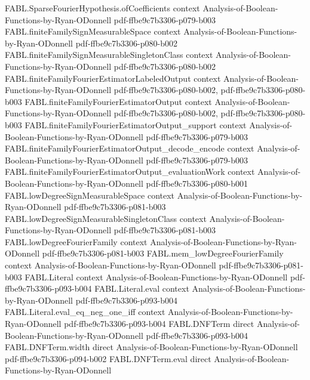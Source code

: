 \begin{theorem}
  {FABL.SparseFourierHypothesis.ofCoefficients}
  {context}
  {Analysis-of-Boolean-Functions-by-Ryan-ODonnell}
  {pdf-ffbe9c7b3306-p079-b003}
\proofstep
  {FABL.finiteFamilySignMeasurableSpace}
  {context}
  {Analysis-of-Boolean-Functions-by-Ryan-ODonnell}
  {pdf-ffbe9c7b3306-p080-b002}
\proofstep
  {FABL.finiteFamilySignMeasurableSingletonClass}
  {context}
  {Analysis-of-Boolean-Functions-by-Ryan-ODonnell}
  {pdf-ffbe9c7b3306-p080-b002}
\proofstep
  {FABL.finiteFamilyFourierEstimatorLabeledOutput}
  {context}
  {Analysis-of-Boolean-Functions-by-Ryan-ODonnell}
  {pdf-ffbe9c7b3306-p080-b002,
    pdf-ffbe9c7b3306-p080-b003}
\proofstep
  {FABL.finiteFamilyFourierEstimatorOutput}
  {context}
  {Analysis-of-Boolean-Functions-by-Ryan-ODonnell}
  {pdf-ffbe9c7b3306-p080-b002,
    pdf-ffbe9c7b3306-p080-b003}
\proofstep
  {FABL.finiteFamilyFourierEstimatorOutput_support}
  {context}
  {Analysis-of-Boolean-Functions-by-Ryan-ODonnell}
  {pdf-ffbe9c7b3306-p079-b003}
\proofstep
  {FABL.finiteFamilyFourierEstimatorOutput_decode_encode}
  {context}
  {Analysis-of-Boolean-Functions-by-Ryan-ODonnell}
  {pdf-ffbe9c7b3306-p079-b003}
\proofstep
  {FABL.finiteFamilyFourierEstimatorOutput_evaluationWork}
  {context}
  {Analysis-of-Boolean-Functions-by-Ryan-ODonnell}
  {pdf-ffbe9c7b3306-p080-b001}
\proofstep
  {FABL.lowDegreeSignMeasurableSpace}
  {context}
  {Analysis-of-Boolean-Functions-by-Ryan-ODonnell}
  {pdf-ffbe9c7b3306-p081-b003}
\proofstep
  {FABL.lowDegreeSignMeasurableSingletonClass}
  {context}
  {Analysis-of-Boolean-Functions-by-Ryan-ODonnell}
  {pdf-ffbe9c7b3306-p081-b003}
\proofstep
  {FABL.lowDegreeFourierFamily}
  {context}
  {Analysis-of-Boolean-Functions-by-Ryan-ODonnell}
  {pdf-ffbe9c7b3306-p081-b003}
\proofstep
  {FABL.mem_lowDegreeFourierFamily}
  {context}
  {Analysis-of-Boolean-Functions-by-Ryan-ODonnell}
  {pdf-ffbe9c7b3306-p081-b003}
\proofstep
  {FABL.Literal}
  {context}
  {Analysis-of-Boolean-Functions-by-Ryan-ODonnell}
  {pdf-ffbe9c7b3306-p093-b004}
\proofstep
  {FABL.Literal.eval}
  {context}
  {Analysis-of-Boolean-Functions-by-Ryan-ODonnell}
  {pdf-ffbe9c7b3306-p093-b004}
\proofstep
  {FABL.Literal.eval_eq_neg_one_iff}
  {context}
  {Analysis-of-Boolean-Functions-by-Ryan-ODonnell}
  {pdf-ffbe9c7b3306-p093-b004}
\proofstep
  {FABL.DNFTerm}
  {direct}
  {Analysis-of-Boolean-Functions-by-Ryan-ODonnell}
  {pdf-ffbe9c7b3306-p093-b004}
\proofstep
  {FABL.DNFTerm.width}
  {direct}
  {Analysis-of-Boolean-Functions-by-Ryan-ODonnell}
  {pdf-ffbe9c7b3306-p094-b002}
\proofstep
  {FABL.DNFTerm.eval}
  {direct}
  {Analysis-of-Boolean-Functions-by-Ryan-ODonnell}

\end{theorem}
